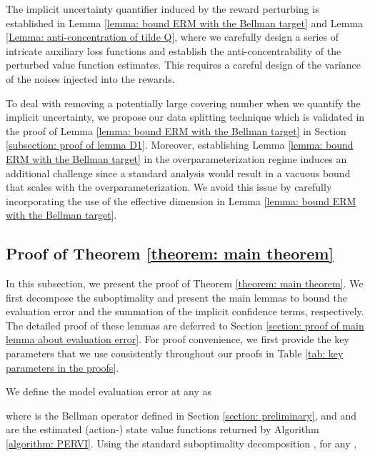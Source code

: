 \documentclass{article} \usepackage{iclr2023/iclr2023_conference,times}
\begin{document}
The implicit uncertainty quantifier induced by the reward perturbing is established in Lemma \ref{lemma: bound ERM with the Bellman target} and Lemma \ref{Lemma: anti-concentration of tilde Q}, where we carefully design a series of intricate auxiliary loss functions and establish the anti-concentrability of the perturbed value function estimates. This requires a careful design of the variance of the noises injected into the rewards. 

To deal with removing a potentially large covering number when we quantify the implicit uncertainty, we propose our data splitting technique which is validated in the proof of Lemma \ref{lemma: bound ERM with the Bellman target} in Section \ref{subsection: proof of lemma D1}.  Moreover, establishing Lemma \ref{lemma: bound ERM with the Bellman target} in the overparameterization regime induces an additional challenge since a standard analysis would result in a vacuous bound that scales with the overparameterization. We avoid this issue by carefully incorporating the use of the effective dimension in Lemma \ref{lemma: bound ERM with the Bellman target}.  

 






\color{black}

\subsection{Proof of Theorem \ref{theorem: main theorem}}
\label{subsection: proof of theorem 1}
In this subsection, we present the proof of Theorem \ref{theorem: main theorem}. We first decompose the suboptimality  and present the main lemmas to bound the evaluation error and the summation of the implicit confidence terms, respectively. The detailed proof of these lemmas are deferred to Section \ref{section: proof of main lemma about evaluation error}. For proof convenience,  we first provide the key parameters that we use consistently throughout our proofs in Table \ref{tab: key parameters in the proofs}. 


We define the model evaluation error at any  as 

where  is the Bellman operator defined in Section \ref{section: preliminary}, and  and  are the estimated (action-) state value functions returned by Algorithm \ref{algorithm: PERVI}. Using the standard suboptimality decomposition \citep[Lemma~3.1]{jin2021pessimism}, for any ,  
\end{document}
